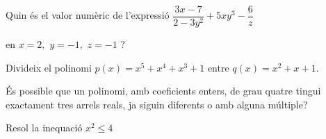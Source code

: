 \begin{mylist}

\end{mylist}

\vspace{1cm}
 
\begin{autoaval}{31}

\begin{mylist}
	\exer[2] Quin és el valor numèric de l'expressió $\dfrac{3x-7}{2-3y^{2} } +5xy^{3} -\dfrac{6}{z} $ \par en $x=2,\, \, y=-1,\, \, z=-1$ ? 

 
		\exer[2]  Divideix el polinomi $p(x)=x^{5} +x^{4} +x^{3} +1$ entre $q(x)=x^{2} +x+1$.

 
\exer[2]  És possible que un polinomi, amb coeficients enters, de grau quatre tingui exactament tres arrels reals, ja siguin diferents o amb alguna múltiple?  
	
 
 
\exer[2]  Resol la inequació $x^{2} \leq 4$  

 

\end{mylist}
\end{autoaval}

